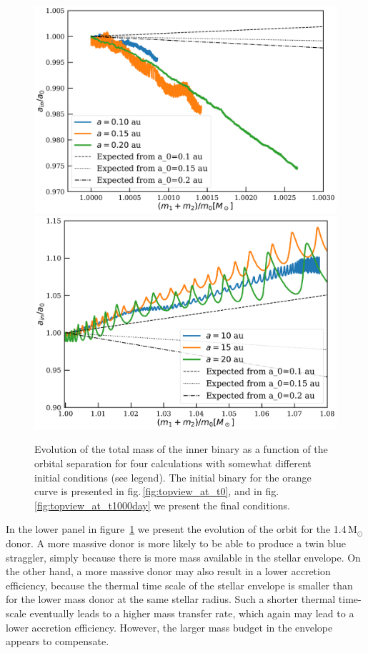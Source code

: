 \documentclass{aastex62}
\newcommand{\MSun}{\mbox{M$_\odot$}}
\begin{document}
\begin{figure}[ht!]
  \includegraphics[width=\columnwidth]{fig_orbital_evolution_for_12MSun.pdf}
  \includegraphics[width=\columnwidth]{fig_orbital_evolution_for_14MSun.pdf}
  \caption{Evolution of the total mass of the inner binary as a
    function of the orbital separation for four calculations with
    somewhat different initial conditions (see legend).  The initial
    binary for the orange curve is presented in
    fig.\,\ref{fig:topview_at_t0}, and in
    fig.\,\ref{fig:topview_at_t1000day} we present the final
    conditions.
\label{fig:mass_vs_semimajor_axis}}
\end{figure}

In the lower panel in figure~\ref{fig:mass_vs_semimajor_axis} we
present the evolution of the orbit for the 1.4\,\MSun\, donor. A more
massive donor is more likely to be able to produce a twin blue
straggler, simply because there is more mass available in the stellar
envelope. On the other hand, a more massive donor may also result in a
lower accretion efficiency, because the thermal time scale of the
stellar envelope is smaller than for the lower mass donor at the same
stellar radius. Such a shorter thermal time-scale eventually leads to
a higher mass transfer rate, which again may lead to a lower accretion
efficiency. However, the larger mass budget in the envelope appears to
compensate.
\end{document}
